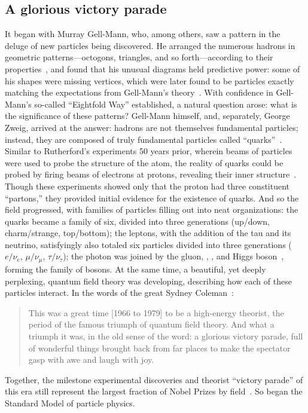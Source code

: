\begin{dissertationintroduction}
\section*{A glorious victory parade}
It began with Murray Gell-Mann, who, among others, saw a pattern in the deluge of new particles being discovered. 
He arranged the numerous hadrons in geometric patterns---octogons, triangles, and so forth---according to their properties~\cite{Gell-Mann:1961omu}, and found that his unusual diagrams held predictive power: some of his shapes were missing vertices, which were later found to be particles exactly matching the expectations from Gell-Mann's theory~\cite{PhysRevLett.12.204}. 
With confidence in Gell-Mann's so-called ``Eightfold Way'' established, a natural question arose: what is the significance of these patterns? 
Gell-Mann himself, and, separately, George Zweig, arrived at the answer: hadrons are not themselves fundamental particles; instead, they are composed of truly fundamental particles called ``quarks''~\cite{Lichtenberg:784713}.
Similar to Rutherford's experiments 50 years prior, wherein beams of particles were used to probe the structure of the atom, the reality of quarks could be probed by firing beams of electrons at protons, revealing their inner structure~\cite{PhysRevLett.23.930, PhysRevLett.23.935}. 
Though these experiments showed only that the proton had three constituent ``partons,'' they provided initial evidence for the existence of quarks.
And so the field progressed, with families of particles filling out into neat organizations: 
the quarks became a family of six, divided into three generations (up/down, charm/strange, top/bottom); %
the leptons, with the addition of the tau and its neutrino, satisfyingly also totaled six particles divided into three generations ($e/\nu_e$, $\mu/\nu_\mu$, $\tau/\nu_\tau$); %
the photon was joined by the gluon, \PW, \PZ, and Higgs boson~\cite{ATLASdisc, CMSdisc}, forming the family of bosons. %
At the same time, a beautiful, yet deeply perplexing, quantum field theory was developing, describing how each of these particles interact. 
In the words of the great Sydney Coleman~\cite{Coleman}:
\begin{quote}
    This was a great time [1966 to 1979] to be a high-energy theorist, the period of the famous triumph of quantum field theory. 
    And what a triumph it was, in the old sense of the word: a glorious victory parade, full of wonderful things brought back from far places to make the spectator gasp with awe and laugh with joy. 
\end{quote}
Together, the milestone experimental discoveries and theorist ``victory parade'' of this era still represent the largest fraction of Nobel Prizes by field~\cite{ParticleNobels}. 
So began the Standard Model of particle physics.


\end{dissertationintroduction}
